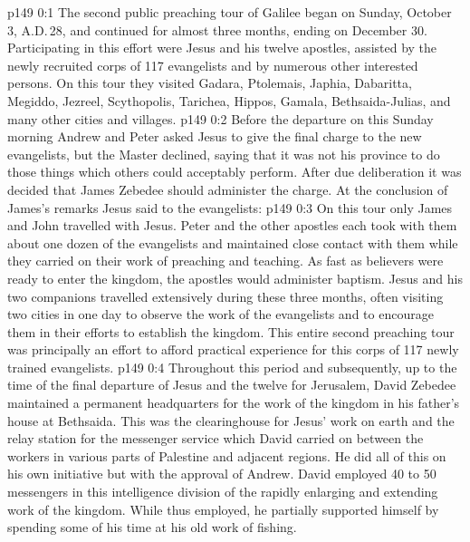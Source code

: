\author{Midwayer Commission}
\vs p149 0:1 The second public preaching tour of Galilee began on Sunday, October 3, A.D.\,28, and continued for almost three months, ending on December 30. Participating in this effort were Jesus and his twelve apostles, assisted by the newly recruited corps of 117 evangelists and by numerous other interested persons. On this tour they visited Gadara, Ptolemais, Japhia, Dabaritta, Megiddo, Jezreel, Scythopolis, Tarichea, Hippos, Gamala, Bethsaida\hyp{}Julias, and many other cities and villages.
\vs p149 0:2 Before the departure on this Sunday morning Andrew and Peter asked Jesus to give the final charge to the new evangelists, but the Master declined, saying that it was not his province to do those things which others could acceptably perform. After due deliberation it was decided that James Zebedee should administer the charge. At the conclusion of James’s remarks Jesus said to the evangelists: 
\vs p149 0:3 On this tour only James and John travelled with Jesus. Peter and the other apostles each took with them about one dozen of the evangelists and maintained close contact with them while they carried on their work of preaching and teaching. As fast as believers were ready to enter the kingdom, the apostles would administer baptism. Jesus and his two companions travelled extensively during these three months, often visiting two cities in one day to observe the work of the evangelists and to encourage them in their efforts to establish the kingdom. This entire second preaching tour was principally an effort to afford practical experience for this corps of 117 newly trained evangelists.
\vs p149 0:4 \pc Throughout this period and subsequently, up to the time of the final departure of Jesus and the twelve for Jerusalem, David Zebedee maintained a permanent headquarters for the work of the kingdom in his father’s house at Bethsaida. This was the clearinghouse for Jesus’ work on earth and the relay station for the messenger service which David carried on between the workers in various parts of Palestine and adjacent regions. He did all of this on his own initiative but with the approval of Andrew. David employed 40 to 50 messengers in this intelligence division of the rapidly enlarging and extending work of the kingdom. While thus employed, he partially supported himself by spending some of his time at his old work of fishing.
